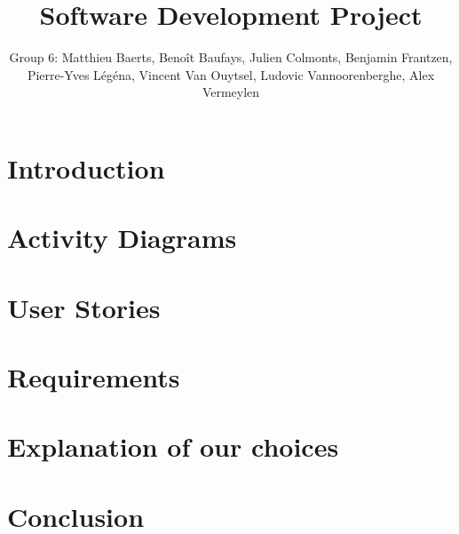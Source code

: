 \documentclass[11pt,a4paper]{article}
\title{Software Development Project}
\author{Group 6: Matthieu Baerts, Benoît Baufays, Julien Colmonts, Benjamin Frantzen, Pierre-Yves Légéna, Vincent Van Ouytsel, Ludovic Vannoorenberghe, Alex Vermeylen}
\begin{document}


\tableofcontents
\newpage

\section*{Introduction}


\newpage
\section{Activity Diagrams}


\newpage
\section{User Stories}


\newpage
\section{Requirements}


\newpage 
\section{Explanation of our choices}



\newpage
\section*{Conclusion}



\end{document}
